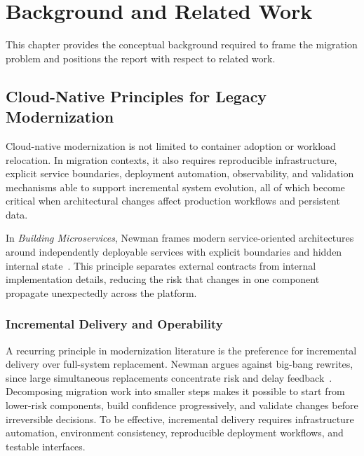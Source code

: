 \chapter{Background and Related Work}
\label{chap:background}

This chapter provides the conceptual background required to frame the migration problem and positions the report with respect to related work.

\section{Cloud-Native Principles for Legacy Modernization}
Cloud-native modernization is not limited to container adoption or workload relocation. In migration contexts, it also requires reproducible infrastructure, explicit service boundaries, deployment automation, observability, and validation mechanisms able to support incremental system evolution, all of which become critical when architectural changes affect production workflows and persistent data.

In \emph{Building Microservices}, Newman frames modern service-oriented architectures around independently deployable services with explicit boundaries and hidden internal state~\cite{newman2021building}. This principle separates external contracts from internal implementation details, reducing the risk that changes in one component propagate unexpectedly across the platform.

\subsection{Incremental Delivery and Operability}
A recurring principle in modernization literature is the preference for incremental delivery over full-system replacement. Newman argues against big-bang rewrites, since large simultaneous replacements concentrate risk and delay feedback~\cite{newman2021building}. Decomposing migration work into smaller steps makes it possible to start from lower-risk components, build confidence progressively, and validate changes before irreversible decisions. To be effective, incremental delivery requires infrastructure automation, environment consistency, reproducible deployment workflows, and testable interfaces.

